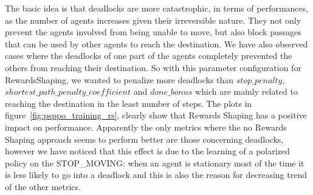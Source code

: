 \documentclass[11pt, a4paper, hidelinks]{report}
\begin{document}
The basic idea is that deadlocks are more catastrophic, in terms of performances, as the number of agents increases given their irreversible nature.
They not only prevent the agents involved from being unable to move, but also block passages that can be used by other agents to reach the destination.
We have also observed cases where the deadlocks of one part of the agents completely prevented the others from reaching their destination.
So with this parameter configuration for RewardsShaping, we wanted to penalize more deadlocks than  \textbf{$stop\_penalty$}, \textbf{$shortest\_path\_penalty\_coefficient$} and \textbf{$done\_bonus$} which are mainly related to reaching the destination in the least number of steps.
The plots in figure~\ref{fig:psppo_training_rs}, clearly show that Rewards Shaping has a positive impact on performance.
Apparently the only metrics where the no Rewards Shaping approach seems to perform better are those concerning deadlocks, however we have noticed that this effect is due to the learning of a polarized policy on the STOP\_MOVING: when an agent is stationary most of the time it is less likely to go into a deadlock and this is also the reason for decreasing trend of the other metrics.
\end{document}
